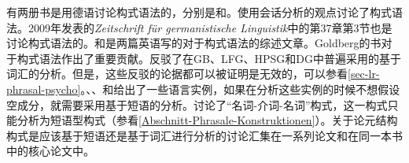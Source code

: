 有两册书是用德语讨论构式语法的，分别是和。\citet{Deppermann2006a}使用会话分析的观点讨论了构式语法。2009年发表的\textit{Zeitschrift für germanistische Linguistik}中的第37章第3节也是讨论构式语法的。和是两篇英语写的对于构式语法的综述文章。Goldberg的书\citeyearpar{Goldberg95a,Goldberg2006a,Goldberg2009a}对于构式语法作出了重要贡献。\citet{Goldberg95a}反驳了在GB、LFG、HPSG和DG中普遍采用的基于词汇的分析。但是，这些反驳的论据都可以被证明是无效的，可以参看\ref{sec-lr-phrasal-psycho}。\citet{Sag97a}、\citet{Borsley2006a}、\citet{Jacobs2008a}和\citet{ML2009a}给出了一些语言实例，如果在分析这些实例的时候不想假设空成分，就需要采用基于短语的分析。\citet{Jackendoff2008a}讨论了“名词-介词-名词”构式，这一构式只能分析为短语型构式（参看\ref{Abschnitt-Phrasale-Konstruktionen}）。关于论元结构构式是应该基于短语还是基于词汇进行分析的讨论\citep{Goldberg95a,Goldberg2006a,Mueller2006d}汇集在一系列论文\citep{Goldberg2013a}和\citet{MWArgSt}在同一本书中的核心论文中。

